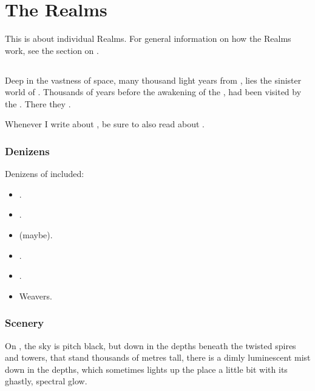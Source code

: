 \chapter{The Realms}
This is about individual Realms. 
For general information on how the Realms work, see the section on . 















\section{\Erebos}
\index{\Erebos}
Deep in the vastness of space, many thousand light years from \Miith{}, lies the sinister world of \Erebos{}. 
Thousands of years before the awakening of the \dragons{}, \Erebos{} had been visited by the \voyagers{}. 
There they . 

Whenever I write about \Erebos, be sure to also read about .









\subsection{Denizens}
Denizens of \Erebos included:
\begin{itemize}
  \item \Banes.
  \item \Flyingpolyps.
  \item \Noggyaleth (maybe).
  \item \Screamers.
  \item \Umbrae.
  \item Weavers.
\end{itemize}










\subsection{Scenery}
On \Erebos, the sky is pitch black, but down in the depths beneath the twisted spires and towers, that stand thousands of metres tall, there is a dimly luminescent mist down in the depths, which sometimes lights up the place a little bit with its ghastly, spectral glow. 

